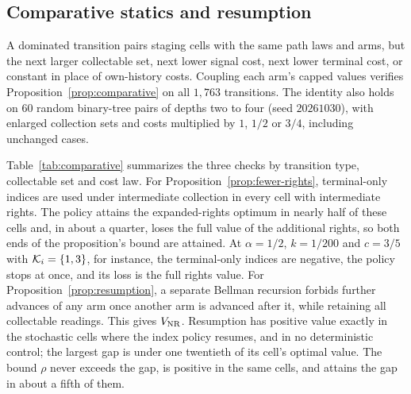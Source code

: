 \subsection{Comparative statics and resumption}
\label{app:comparative-results}

A dominated transition pairs staging cells with the same path laws and arms,
but the next larger collectable set, next lower signal cost, next lower terminal
cost, or constant in place of own-history costs. Coupling each arm's capped
values verifies Proposition~\ref{prop:comparative} on all $1{,}763$ transitions.
The identity also holds on 60 random binary-tree pairs of depths two to four
(seed $20261030$), with enlarged collection sets and costs multiplied by
$1$, $1/2$ or $3/4$, including unchanged cases.

Table~\ref{tab:comparative} summarizes the three checks by transition type,
collectable set and cost law.
For Proposition~\ref{prop:fewer-rights}, terminal-only indices are used under
intermediate collection in every cell with intermediate rights. The policy
attains the expanded-rights optimum in nearly half of these cells and, in about
a quarter, loses the full value of the additional rights, so both ends of the
proposition's bound are attained. At $\alpha=1/2$, $k=1/200$ and $c=3/5$ with
$\mathcal{K}_i=\{1,3\}$, for instance, the terminal-only indices are negative, the
policy stops at once, and its loss is the full rights value.
For Proposition~\ref{prop:resumption}, a separate Bellman recursion forbids
further advances of any arm once another arm is advanced after it, while
retaining all collectable readings. This gives $V_{\rm NR}$.
Resumption has positive value exactly in the stochastic cells where the index
policy resumes, and in no deterministic control; the largest gap is under one
twentieth of its cell's optimal value. The bound $\rho$ never exceeds the gap,
is positive in the same cells, and attains the gap in about a fifth of them.

